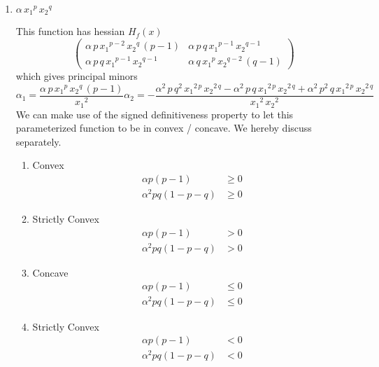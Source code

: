 \begin{enumerate}
\item $\alpha \,{x_1 }^p \,{x_2 }^q$\par
This function has hessian $H_f(x)$
\[
\left(\begin{array}{cc}
\alpha \,p\,{x_1 }^{p-2} \,{x_2 }^q \,{\left(p-1\right)} & \alpha \,p\,q\,{x_1 }^{p-1} \,{x_2 }^{q-1} \\
\alpha \,p\,q\,{x_1 }^{p-1} \,{x_2 }^{q-1}  & \alpha \,q\,{x_1 }^p \,{x_2 }^{q-2} \,{\left(q-1\right)}
\end{array}\right)
\]
which gives principal minors
\[
\alpha_1 = \frac{\alpha \,p\,{x_1 }^p \,{x_2 }^q \,{\left(p-1\right)}}{{x_1 }^2 }
\alpha_2 = -\frac{\alpha^2 \,p\,q^2 \,{x_1 }^{2\,p} \,{x_2 }^{2\,q} -\alpha^2 \,p\,q\,{x_1 }^{2\,p} \,{x_2 }^{2\,q} +\alpha^2 \,p^2 \,q\,{x_1 }^{2\,p} \,{x_2 }^{2\,q} }{{x_1 }^2 \,{x_2 }^2 }
\]
We can make use of the signed definitiveness property to let this parameterized function to be in convex / concave. We hereby discuss separately.

\begin{enumerate}
\item Convex
\begin{align*}
    \alpha p (p-1)& \geq0 \\
    \alpha^2 pq (1 - p - q) &\geq 0
\end{align*}
\item Strictly Convex
\begin{align*}
    \alpha p (p-1)& > 0 \\
    \alpha^2 pq (1 - p - q) &> 0
\end{align*}
\item Concave
\begin{align*}
    \alpha p (p-1)& \leq0 \\
    \alpha^2 pq (1 - p - q) &\leq 0
\end{align*}
\item Strictly Convex
\begin{align*}
    \alpha p (p-1)& < 0 \\
    \alpha^2 pq (1 - p - q) &< 0
\end{align*}
\end{enumerate}

\end{enumerate}


